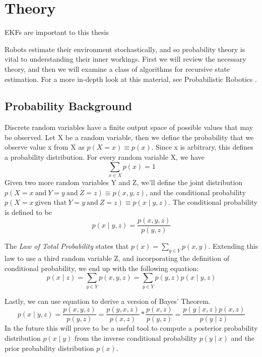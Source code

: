 \chapter{Theory}

EKFs are important to this thesis

Robots estimate their environment stochastically, and so probability theory is vital to understanding their inner workings. First we will review the necessary theory, and then we will examine a class of algorithms for recursive state estimation. For a more in-depth look at this material, see Probabilistic Robotics \cite{probabilisticRobotics}.

\section{Probability Background}
Discrete random variables have a finite output space of possible values that may be observed. Let X be a random variable, then we define the probability that we observe value x from X as \( p(X = x) \equiv p(x)\). Since x is arbitrary, this defines a probability distribution. For every random variable X, we have
\begin{equation*}
\sum\limits_{x \in X} p(x) = 1
\end{equation*}
Given two more random variables Y and Z, we'll define the joint distribution \(p(X=x\ \textrm{and}\ Y=y\ \textrm{and}\ Z=z) \equiv p(x,y,z)\), and the conditional probability \(p(X=x\ \textrm{given that}\ Y=y\ \textrm{and}\ Z=z) \equiv p(x \mathbin{\vert} y,z)\). The conditional probability is defined to be
\begin{equation} \label{eqCondProb}
p(x \mathbin{\vert} y,z) = \frac{p(x,y,z)}{p(y,z)}
\end{equation}

The \textit{Law of Total Probability} states that \(p(x) = \sum\limits_{y \in Y} p(x,y)\). Extending this law to use a third random variable Z, and incorporating the definition of conditional probability, we end up with the following equation:
\begin{equation} \label{eqTotalProb}
p(x \mathbin{\vert} z) = \sum\limits_{y \in Y} p(x,y,z)
= \sum\limits_{y \in Y} p(y,z)p(x \mathbin{\vert} y,z)
\end{equation}

Lastly, we can use equation  to derive a version of Bayes' Theorem. 
\begin{equation} \label{eqBayesThm}
p(x \mathbin{\vert} y,z) = \frac{p(x,y,z)}{p(y,z)} = \frac{p(y,x,z)}{p(x,z)} * \frac{p(x,z)}{p(y,z)} = \frac{p(y \mathbin{\vert} x,z)p(x,z)}{p(y \mathbin{\vert} z)}
\end{equation}
In the future this will prove to be a useful tool to compute a posterior probability distribution \(p(x \mathbin{\vert} y)\) from the inverse conditional probability \(p(y \mathbin{\vert} x)\) and the prior probability distribution \(p(x)\).

